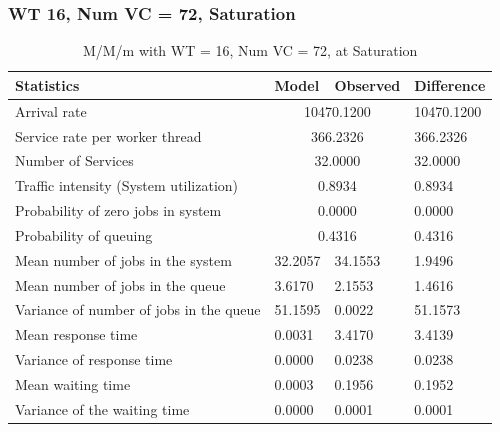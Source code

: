 \documentclass[11pt,a4paper]{article}
\begin{document}
\subsubsection{WT 16, Num VC = 72, Saturation}

\begin{table}[H]
	\centering
	\caption{M/M/m with WT = 16, Num VC = 72, at Saturation}
	\begin{tabular}{|l|l|l|l|}
		\hline
		Statistics                              & Model          & Observed       & Difference \\ \hline
		Arrival rate                            & \multicolumn{2}{c|}{10470.1200} & 10470.1200 \\ \hline
		Service rate per worker thread          & \multicolumn{2}{c|}{366.2326}   & 366.2326   \\ \hline
		Number of Services                      & \multicolumn{2}{c|}{32.0000}    & 32.0000    \\ \hline
		Traffic intensity (System utilization)  & \multicolumn{2}{c|}{0.8934}     & 0.8934     \\ \hline
		Probability of zero jobs in system      & \multicolumn{2}{c|}{0.0000}     & 0.0000     \\ \hline
		Probability of queuing                 & \multicolumn{2}{c|}{0.4316}     & 0.4316     \\ \hline
		Mean number of jobs in the system       & 32.2057        & 34.1553        & 1.9496     \\ \hline
		Mean number of jobs in the queue        & 3.6170         & 2.1553         & 1.4616     \\ \hline
		Variance of number of jobs in the queue & 51.1595        & 0.0022         & 51.1573    \\ \hline
		Mean response time                      & 0.0031         & 3.4170         & 3.4139     \\ \hline
		Variance of response time               & 0.0000         & 0.0238         & 0.0238     \\ \hline
		Mean waiting time                       & 0.0003         & 0.1956         & 0.1952     \\ \hline
		Variance of the waiting time            & 0.0000         & 0.0001         & 0.0001     \\ \hline
	\end{tabular}
\end{table}
\end{document}
